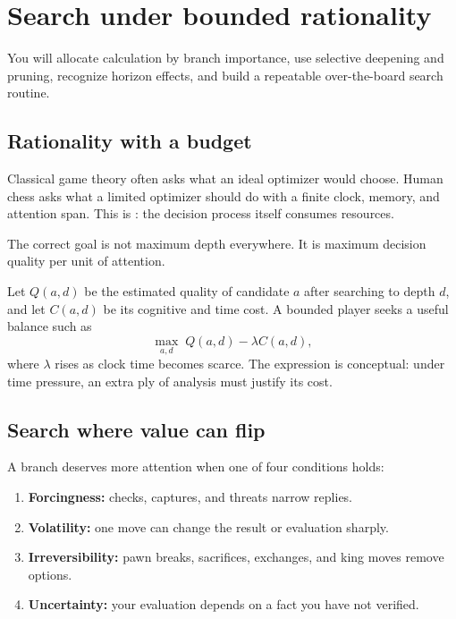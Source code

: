 \chapter{Search under bounded rationality}
\begin{learningbox}
You will allocate calculation by branch importance, use selective deepening and pruning, recognize horizon effects, and build a repeatable over-the-board search routine.
\end{learningbox}

\section{Rationality with a budget}
Classical game theory often asks what an ideal optimizer would choose. Human chess asks what a limited optimizer should do with a finite clock, memory, and attention span. This is : the decision process itself consumes resources.

The correct goal is not maximum depth everywhere. It is maximum decision quality per unit of attention.

\begin{formalbox}
Let $Q(a,d)$ be the estimated quality of candidate $a$ after searching to depth $d$, and let $C(a,d)$ be its cognitive and time cost. A bounded player seeks a useful balance such as
\[
\max_{a,d}\; Q(a,d)-\lambda C(a,d),
\]
where $\lambda$ rises as clock time becomes scarce.
The expression is conceptual: under time pressure, an extra ply of analysis must justify its cost.
\end{formalbox}

\section{Search where value can flip}
A branch deserves more attention when one of four conditions holds:

\begin{enumerate}[label=\textbf{\arabic*.},leftmargin=2em]
\item \textbf{Forcingness:} checks, captures, and threats narrow replies.
\item \textbf{Volatility:} one move can change the result or evaluation sharply.
\item \textbf{Irreversibility:} pawn breaks, sacrifices, exchanges, and king moves remove options.
\item \textbf{Uncertainty:} your evaluation depends on a fact you have not verified.
\end{enumerate}

